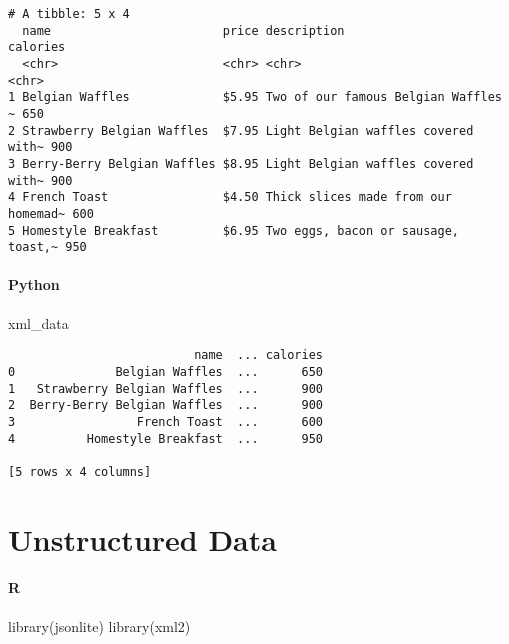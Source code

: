 \documentclass[
  letterpaper,
  DIV=11,
  numbers=noendperiod]{scrreprt}
\newenvironment{Shaded}{\begin{snugshade}}{\end{snugshade}}
\newcommand{\FunctionTok}[1]{\textcolor[rgb]{0.28,0.35,0.67}{#1}}
\newcommand{\NormalTok}[1]{\textcolor[rgb]{0.00,0.46,0.62}{#1}}
\begin{document}
\begin{verbatim}
# A tibble: 5 x 4
  name                        price description                         calories
  <chr>                       <chr> <chr>                               <chr>   
1 Belgian Waffles             $5.95 Two of our famous Belgian Waffles ~ 650     
2 Strawberry Belgian Waffles  $7.95 Light Belgian waffles covered with~ 900     
3 Berry-Berry Belgian Waffles $8.95 Light Belgian waffles covered with~ 900     
4 French Toast                $4.50 Thick slices made from our homemad~ 600     
5 Homestyle Breakfast         $6.95 Two eggs, bacon or sausage, toast,~ 950     
\end{verbatim}

\hypertarget{python-10}{%
\subsubsection{Python}\label{python-10}}

\begin{Shaded}
\begin{Highlighting}[]
\NormalTok{xml\_data}
\end{Highlighting}
\end{Shaded}

\begin{verbatim}
                          name  ... calories
0              Belgian Waffles  ...      650
1   Strawberry Belgian Waffles  ...      900
2  Berry-Berry Belgian Waffles  ...      900
3                 French Toast  ...      600
4          Homestyle Breakfast  ...      950

[5 rows x 4 columns]
\end{verbatim}

\hypertarget{unstructured-data}{%
\chapter{Unstructured Data}\label{unstructured-data}}

\hypertarget{r-11}{%
\subsubsection{R}\label{r-11}}

\begin{Shaded}
\begin{Highlighting}[]
\FunctionTok{library}\NormalTok{(jsonlite)}
\FunctionTok{library}\NormalTok{(xml2)}
\end{Highlighting}
\end{Shaded}
\end{document}
